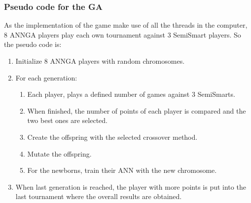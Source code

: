 		\subsubsection{Pseudo code for the GA} %
		\label{ssub:pseudo_code_for_the_ga}
		As the implementation of the game make use of all the threads in the computer, 8 ANNGA players play each own tournament against 3 SemiSmart players.
		So the pseudo code is:
		\begin{enumerate}
			\item Initialize 8 ANNGA players with random chromosomes.
			\item For each generation:
			\begin{enumerate}
				\item Each player, plays a defined number of games against 3 SemiSmarts.
				\item When finished, the number of points of each player is compared and the two best ones are selected.
				\item Create the offspring with the selected crossover method.
				\item Mutate the offspring.
				\item For the newborns, train their ANN with the new chromosome.
			\end{enumerate}

			\item When last generation is reached, the player with more points is put into the last tournament where the overall results are obtained.
		\end{enumerate}
